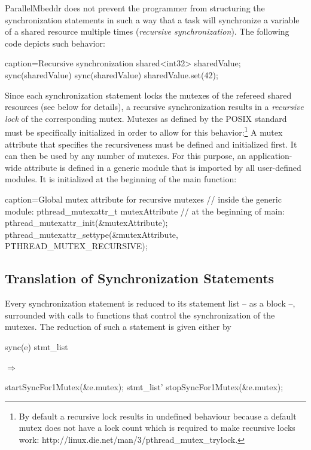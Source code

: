 ParallelMbeddr does not prevent the programmer from structuring the synchronization statements in such a way that a task will synchronize a variable of a shared resource multiple times (\textit{recursive synchronization}). The following code depicts such behavior:
\begin{ccode}{caption=Recursive synchronization}
shared<int32> sharedValue;
sync(sharedValue) {
  sync(sharedValue) {
    sharedValue.set(42);
  }
}
\end{ccode}
Since each synchronization statement locks the mutexes of the refereed shared resources (see below for details), a recursive synchronization results in a \textit{recursive lock} of the corresponding mutex. Mutexes as defined by the POSIX standard must be specifically initialized in order to allow for this behavior:\footnote{By default a recursive lock results in undefined behaviour because a default mutex does not have a lock count which is required to make recursive locks work: http://linux.die.net/man/3/pthread\_mutex\_trylock.} A mutex attribute that specifies the recursiveness must be defined and initialized first. It can then be used by any number of mutexes. For this purpose, an application-wide attribute is defined in a generic module that is imported by all user-defined modules. It is initialized at the beginning of the main function:

\vspace{10mm}
\begin{ccode}{caption=Global mutex attribute for recursive mutexes}
// inside the generic module:
pthread_mutexattr_t mutexAttribute
// at the beginning of main:
pthread_mutexattr_init(&mutexAttribute);
pthread_mutexattr_settype(&mutexAttribute, PTHREAD_MUTEX_RECURSIVE);
\end{ccode}

\subsection{Translation of Synchronization Statements}
Every synchronization statement is reduced to its statement list -- as a block --, surrounded with calls to functions that control the synchronization of the mutexes. The reduction of such a statement is given either by

\vspace{4mm}
\begin{minipage}{1\textwidth}
\begin{center}
\begin{minipage}{0.31\textwidth}
\begin{ccode}{}
sync(e) stmt_list
\end{ccode}
\end{minipage}
\qquad$\Longrightarrow$\qquad\quad
\begin{minipage}{0.5\textwidth}
\begin{ccode}{}
startSyncFor1Mutex(&e.mutex);
stmt_list'
stopSyncFor1Mutex(&e.mutex);
\end{ccode}
\end{minipage}
\end{center}
\end{minipage}
\vspace{2mm}

